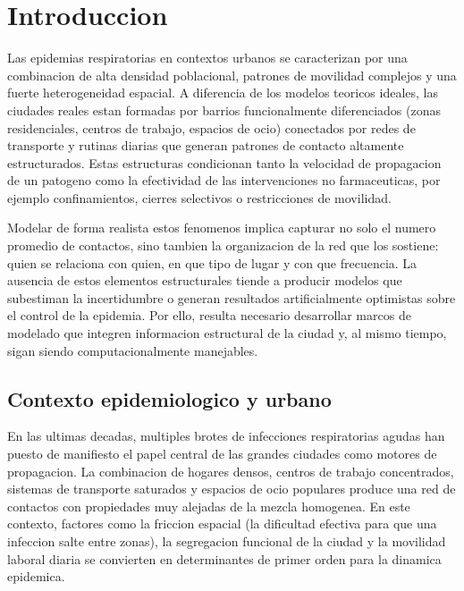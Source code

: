 
\section{Introduccion}

Las epidemias respiratorias en contextos urbanos se caracterizan por una combinacion de alta densidad poblacional, patrones de movilidad complejos y una fuerte heterogeneidad espacial. A diferencia de los modelos teoricos ideales, las ciudades reales estan formadas por barrios funcionalmente diferenciados (zonas residenciales, centros de trabajo, espacios de ocio) conectados por redes de transporte y rutinas diarias que generan patrones de contacto altamente estructurados. Estas estructuras condicionan tanto la velocidad de propagacion de un patogeno como la efectividad de las intervenciones no farmaceuticas, por ejemplo confinamientos, cierres selectivos o restricciones de movilidad.

Modelar de forma realista estos fenomenos implica capturar no solo el numero promedio de contactos, sino tambien la organizacion de la red que los sostiene: quien se relaciona con quien, en que tipo de lugar y con que frecuencia. La ausencia de estos elementos estructurales tiende a producir modelos que subestiman la incertidumbre o generan resultados artificialmente optimistas sobre el control de la epidemia. Por ello, resulta necesario desarrollar marcos de modelado que integren informacion estructural de la ciudad y, al mismo tiempo, sigan siendo computacionalmente manejables.

\subsection{Contexto epidemiologico y urbano}

En las ultimas decadas, multiples brotes de infecciones respiratorias agudas han puesto de manifiesto el papel central de las grandes ciudades como motores de propagacion. La combinacion de hogares densos, centros de trabajo concentrados, sistemas de transporte saturados y espacios de ocio populares produce una red de contactos con propiedades muy alejadas de la mezcla homogenea. En este contexto, factores como la friccion espacial (la dificultad efectiva para que una infeccion salte entre zonas), la segregacion funcional de la ciudad y la movilidad laboral diaria se convierten en determinantes de primer orden para la dinamica epidemica.

